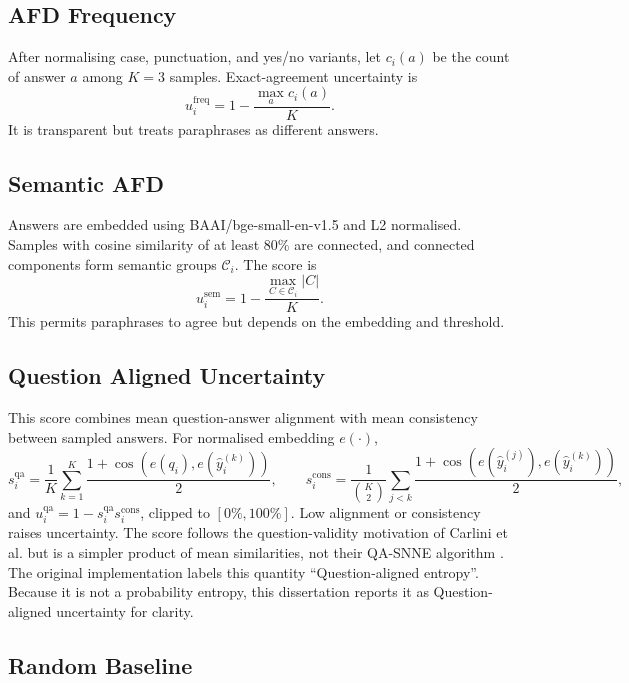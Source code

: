 \subsection{AFD Frequency}

After normalising case, punctuation, and yes/no variants, let $c_i(a)$ be the count of answer $a$ among $K=3$ samples. Exact-agreement uncertainty is
\begin{equation}
u_i^{\mathrm{freq}}=1-\frac{\max_a c_i(a)}{K}.
\end{equation}
It is transparent but treats paraphrases as different answers.

\subsection{Semantic AFD}

Answers are embedded using BAAI/bge-small-en-v1.5 and L2 normalised. Samples with cosine similarity of at least 80\% are connected, and connected components form semantic groups $\mathcal C_i$. The score is
\begin{equation}
u_i^{\mathrm{sem}}=1-\frac{\max_{C\in\mathcal C_i}|C|}{K}.
\end{equation}
This permits paraphrases to agree but depends on the embedding and threshold.

\subsection{Question Aligned Uncertainty}

This score combines mean question-answer alignment with mean consistency between sampled answers. For normalised embedding $e(\cdot)$,
\begin{equation}
s_i^{\mathrm{qa}}=\frac{1}{K}\sum_{k=1}^{K}\frac{1+\cos(e(q_i),e(\hat y_i^{(k)}))}{2},\qquad
s_i^{\mathrm{cons}}=\frac{1}{\binom K2}\sum_{j<k}\frac{1+\cos(e(\hat y_i^{(j)}),e(\hat y_i^{(k)}))}{2},
\end{equation}
and $u_i^{\mathrm{qa}}=1-s_i^{\mathrm{qa}}s_i^{\mathrm{cons}}$, clipped to $[0\%,100\%]$. Low alignment or consistency raises uncertainty. The score follows the question-validity motivation of Carlini et al. but is a simpler product of mean similarities, not their QA-SNNE algorithm \citep{carlini2026qasnne}.
The original implementation labels this quantity ``Question-aligned entropy''. Because it is not a probability entropy, this dissertation reports it as Question-aligned uncertainty for clarity.

\subsection{Random Baseline}

